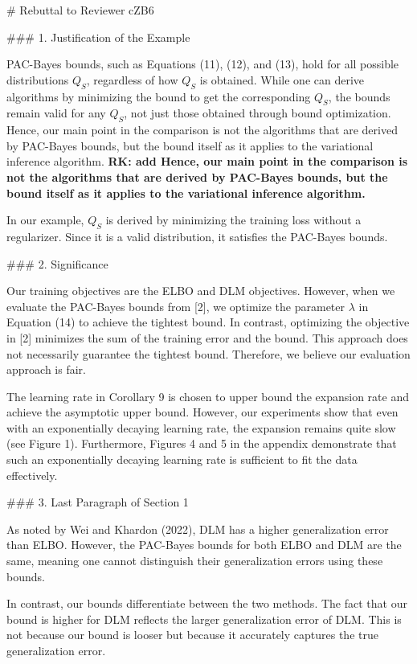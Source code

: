 \documentclass{article}
\begin{document}
\begin{markdown}
# Rebuttal to Reviewer cZB6

### 1. Justification of the Example

PAC-Bayes bounds, such as Equations (11), (12), and (13), hold for all possible distributions $Q_S$, regardless of how $Q_S$ is obtained. While one can derive algorithms by minimizing the bound to get the corresponding $Q_S$, the bounds remain valid for any $Q_S$, not just those obtained through bound optimization. Hence, our main point in the comparison is not the algorithms that are derived by PAC-Bayes bounds, but the bound itself as it applies to the variational inference algorithm.
{\bf RK: add Hence, our main point in the comparison is not the algorithms that are derived by PAC-Bayes bounds, but the bound itself as it applies to the variational inference algorithm.}

In our example, $Q_S$ is derived by minimizing the training loss without a regularizer. Since it is a valid distribution, it satisfies the PAC-Bayes bounds.

### 2. Significance

Our training objectives are the ELBO and DLM objectives. However, when we evaluate the PAC-Bayes bounds from [2], we optimize the parameter $\lambda$ in Equation (14) to achieve the tightest bound.
In contrast, optimizing the objective in [2] minimizes the sum of the training error and the bound. This approach does not necessarily guarantee the tightest bound. Therefore, we believe our evaluation approach is fair.

The learning rate in Corollary 9 is chosen to upper bound the expansion rate and achieve the asymptotic upper bound. However, our experiments show that even with an exponentially decaying learning rate, the expansion remains quite slow (see Figure 1). Furthermore, Figures 4 and 5 in the appendix demonstrate that such an exponentially decaying learning rate is sufficient to fit the data effectively.

### 3. Last Paragraph of Section 1

As noted by Wei and Khardon (2022), DLM has a higher generalization error than ELBO. However, the PAC-Bayes bounds for both ELBO and DLM are the same, meaning one cannot distinguish their generalization errors using these bounds. 

In contrast, our bounds differentiate between the two methods. The fact that our bound is higher for DLM reflects the larger generalization error of DLM. This is not because our bound is looser but because it accurately captures the true generalization error.


\end{markdown}
\end{document}
